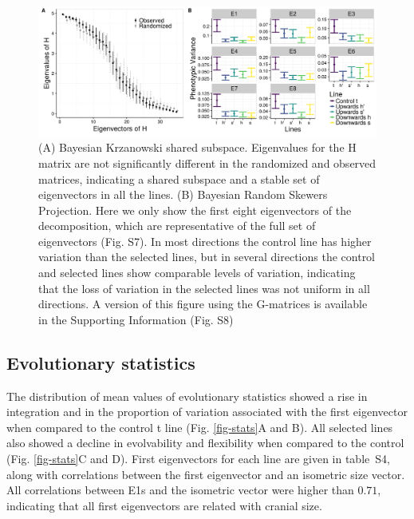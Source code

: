 \begin{refsection}
\begin{figure}
    \centering
    \includegraphics[width=\textwidth]{chapter_ratones/media/figure2.png}
    \caption[Matrix comparisons between selected and control lines]{(A) Bayesian Krzanowski
shared subspace. Eigenvalues for the H matrix are not significantly
different in the randomized and observed matrices, indicating a shared
subspace and a stable set of eigenvectors in all the lines. (B) Bayesian
Random Skewers Projection. Here we only show the first eight
eigenvectors of the decomposition, which are representative of the full
set of eigenvectors (Fig. S7). In most directions the control line has
higher variation than the selected lines, but in several directions the
control and selected lines show comparable levels of variation,
indicating that the loss of variation in the selected lines was not
uniform in all directions. A version of this figure using the G-matrices
is available in the Supporting Information (Fig. S8)}
    \label{fig-comparisons}
\end{figure}

\subsection{Evolutionary statistics}

The distribution of mean values of evolutionary statistics showed a rise
in integration and in the proportion of variation associated with the
first eigenvector when compared to the control t line (Fig.
\ref{fig-stats}A and B). All selected lines also showed a decline in
evolvability and flexibility when compared to the control (Fig.
\ref{fig-stats}C and D). First eigenvectors for each line are given in
table~S4, along with correlations between the first eigenvector and an
isometric size vector. All correlations between E1s and the isometric
vector were higher than \(0.71\), indicating that all first eigenvectors
are related with cranial size.


\end{refsection}
